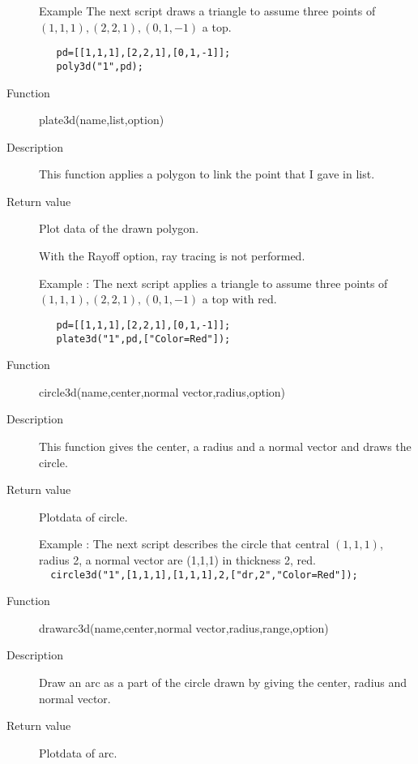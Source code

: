 \documentclass[papersize,a4paper,12pt]{article}
\begin{document}
\begin{description}
 Example The next script draws a triangle to assume three points of $(1,1,1), (2,2,1),(0,1,-1)$ a top.
\begin{verbatim}
   pd=[[1,1,1],[2,2,1],[0,1,-1]];
   poly3d("1",pd);
\end{verbatim}


\hypertarget{plate3d}{}
\item[Function] plate3d(name,list,option)
\item[Description] This function applies a polygon to link the point that I gave in list.
\item[Return value] Plot data of the drawn polygon.

With the Rayoff option, ray tracing is not performed.

 Example : The next script applies a triangle to assume three points of $(1,1,1), (2,2,1),(0,1,-1)$ a top with red.
\begin{verbatim}
   pd=[[1,1,1],[2,2,1],[0,1,-1]]; 
   plate3d("1",pd,["Color=Red"]);
\end{verbatim}


\hypertarget{circle3d}{}
\item[Function] circle3d(name,center,normal vector,radius,option)
\item[Description] This function gives the center, a radius and a normal vector and draws the circle.
\item[Return value] Plotdata of circle.

 Example : The next script describes the circle that central $(1,1,1)$, radius 2, a normal vector are (1,1,1) in thickness 2, red.\\
  
\verb|  circle3d("1",[1,1,1],[1,1,1],2,["dr,2","Color=Red"]); |


\hypertarget{drawarc3d}{}
\item[Function] drawarc3d(name,center,normal vector,radius,range,option)
\item[Description] Draw an arc as a part of the circle drawn by giving the center, radius and normal vector.
\item[Return value] Plotdata of arc.


\end{description}
\end{document}
